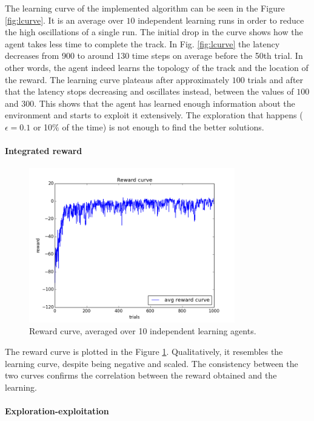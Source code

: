 The learning curve of the implemented algorithm can be seen in the
Figure \ref{fig:lcurve}. It is an average over $10$ independent learning runs in
order to reduce the high oscillations of a single run. The initial drop in the curve
shows how the agent takes less time to 
complete the track. In Fig. \ref{fig:lcurve} the latency decreases from 900 to around 130 time steps on average before the 50th trial. In other words, the agent indeed learns the topology of the track
and the location of the reward. The learning curve plateaus after
approximately $100$ trials and after that the latency stops decreasing and
oscillates instead, between the values of $100$ and $300$. This shows that the agent has learned enough information
about the environment and starts to exploit it extensively. The exploration that
happens ($\epsilon = 0.1$ or 10$\%$ of the time) is not enough to find the better solutions.

\paragraph{Integrated reward}

\begin{figure}[h!]
\centering
\includegraphics[width=0.8\textwidth]{figures/reward_curve.png}
\caption{Reward curve, averaged over 10 independent learning agents. \label{fig:rcurve}}
\end{figure}

The reward curve is plotted in the Figure \ref{fig:rcurve}. Qualitatively, it resembles
the learning curve, despite being negative and scaled. The consistency between
the two curves confirms the correlation between the reward obtained and the
learning.

\paragraph{Exploration-exploitation}


